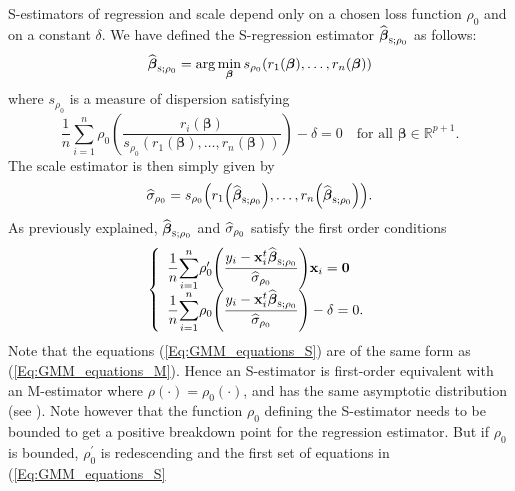 S-estimators of regression and scale depend only on a chosen loss function
$\rho_{0}$ and on a constant $\delta$. We have defined the S-regression
estimator $\sthat{\boldsymbol\beta}_{\stsc{S};\rho_{0}}$ as follows:
\begin{equation}
\sthat{\boldsymbol\beta}_{\stsc{S};\rho_{0}}=\arg\min_{\boldsymbol{\beta
}}s_{\rho_{0}}\left(  r_{1}\left(  \boldsymbol\beta\right)  ,\ldots
,r_{n}\left(  \boldsymbol\beta\right)  \right)  \label{eq:S_min_rho0}%
\end{equation}
where $s_{\rho_{0}}$ is a measure of dispersion satisfying
\[
\frac{1}{n}\sum_{i=1}^{n}\rho_{0}\left(  \frac{r_{i}\left(  \boldsymbol{\beta
}\right)  }{s_{\rho_{0}}\left(  r_{1}\left(  \boldsymbol\beta\right)
,\ldots,r_{n}\left(  \boldsymbol\beta\right)  \right)  }\right)
-\delta=0\quad\text{for all }\boldsymbol\beta\in\mathbb{R}^{p+1}.
\]
The scale estimator is then simply given by
\[
\sthat{\sigma}_{\rho_{0}}=s_{\rho_{0}}\left(  r_{1}\left(  \widehat
{\boldsymbol\beta}_{\stsc{S};\rho_{0}}\right)  ,\ldots,r_{n}\left(
\sthat{\boldsymbol\beta}_{\stsc{S};\rho_{0}}\right)  \right)  .
\]
As previously explained, $\sthat{\boldsymbol\beta}_{\stsc{S};\rho_{0}}$
and $\widehat{\sigma}_{\rho_{0}}$ satisfy the first order conditions
\begin{equation}
\left\{
\begin{array}
[c]{l}%
\dfrac{1}{n}%
{\displaystyle\sum\limits_{i=1}^{n}}
\rho_{0}^{\prime}\left(  \dfrac{y_{i}-\stvec{x}_{i}^{t}\widehat
{\boldsymbol\beta}_{\stsc{S};\rho_{0}}}{\sthat{\sigma}_{\rho_{0}}%
}\right)  \stvec{x}_{i}=\mathbf{0}\\
\dfrac{1}{n}%
{\displaystyle\sum\limits_{i=1}^{n}}
\rho_{0}\left(  \dfrac{y_{i}-\stvec{x}_{i}^{t}\sthat{\boldsymbol\beta%
}_{\stsc{S};\rho_{0}}}{\sthat{\sigma}_{\rho_{0}}}\right)  -\delta=0.
\end{array}
\right.  \label{Eq:GMM_equations_S}%
\end{equation}
Note that the equations (\ref{Eq:GMM_equations_S}) are of the same form as
(\ref{Eq:GMM_equations_M}). Hence an S-estimator is first-order equivalent
with an M-estimator where $\rho\left(  \cdot\right)  =\rho_{0}\left(
\cdot\right)  $, and has the same asymptotic distribution (see
\citealp{rousseeuw:yohai:1984}). Note however that the function $\rho_{0}$
defining the S-estimator needs to be bounded to get a positive breakdown point
for the regression estimator. But if $\rho_{0}$ is bounded, $\rho_{0}^{\prime
}$ is redescending and the first set of equations in (\ref{Eq:GMM_equations_S}%

